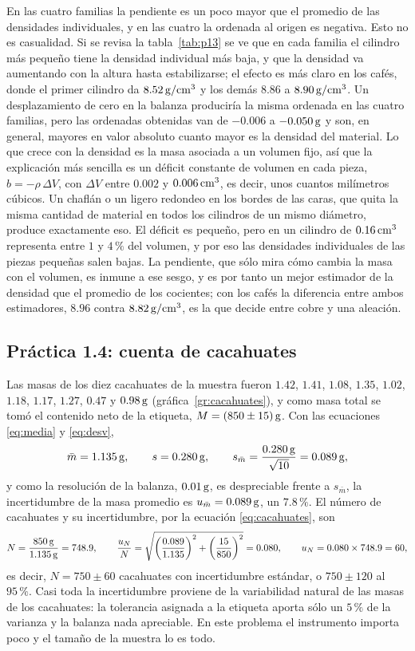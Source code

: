 En las cuatro familias la pendiente es un poco mayor que el promedio de las densidades individuales, y en las cuatro la ordenada al origen es negativa. Esto no es casualidad. Si se revisa la tabla~\ref{tab:p13} se ve que en cada familia el cilindro más pequeño tiene la densidad individual más baja, y que la densidad va aumentando con la altura hasta estabilizarse; el efecto es más claro en los cafés, donde el primer cilindro da $8.52\,\mathrm{g/cm^{3}}$ y los demás $8.86$ a $8.90\,\mathrm{g/cm^{3}}$. Un desplazamiento de cero en la balanza produciría la misma ordenada en las cuatro familias, pero las ordenadas obtenidas van de $-0.006$ a $-0.050\,\mathrm{g}$ y son, en general, mayores en valor absoluto cuanto mayor es la densidad del material. Lo que crece con la densidad es la masa asociada a un volumen fijo, así que la explicación más sencilla es un déficit constante de volumen en cada pieza, $b = -\rho\,\Delta V$, con $\Delta V$ entre $0.002$ y $0.006\,\mathrm{cm^{3}}$, es decir, unos cuantos milímetros cúbicos. Un chaflán o un ligero redondeo en los bordes de las caras, que quita la misma cantidad de material en todos los cilindros de un mismo diámetro, produce exactamente eso. El déficit es pequeño, pero en un cilindro de $0.16\,\mathrm{cm^{3}}$ representa entre $1$ y $4\,\%$ del volumen, y por eso las densidades individuales de las piezas pequeñas salen bajas. La pendiente, que sólo mira cómo cambia la masa con el volumen, es inmune a ese sesgo, y es por tanto un mejor estimador de la densidad que el promedio de los cocientes; con los cafés la diferencia entre ambos estimadores, $8.96$ contra $8.82\,\mathrm{g/cm^{3}}$, es la que decide entre cobre y una aleación.

\subsection{Práctica 1.4: cuenta de cacahuates}

Las masas de los diez cacahuates de la muestra fueron $1.42$, $1.41$, $1.08$, $1.35$, $1.02$, $1.18$, $1.17$, $1.27$, $0.47$ y $0.98\,\mathrm{g}$ (gráfica~\ref{gr:cacahuates}), y como masa total se tomó el contenido neto de la etiqueta, $M = (850 \pm 15)\,\mathrm{g}$. Con las ecuaciones \eqref{eq:media} y \eqref{eq:desv},
\begin{equation*}
    \bar m = 1.135\,\mathrm{g}, \qquad s = 0.280\,\mathrm{g}, \qquad s_{\bar m} = \frac{0.280\,\mathrm{g}}{\sqrt{10}} = 0.089\,\mathrm{g},
\end{equation*}
y como la resolución de la balanza, $0.01\,\mathrm{g}$, es despreciable frente a $s_{\bar m}$, la incertidumbre de la masa promedio es $u_{\bar m} = 0.089\,\mathrm{g}$, un $7.8\,\%$. El número de cacahuates y su incertidumbre, por la ecuación \eqref{eq:cacahuates}, son
\begin{equation*}
    N = \frac{850\,\mathrm{g}}{1.135\,\mathrm{g}} = 748.9, \qquad
    \frac{u_N}{N} = \sqrt{\left(\frac{0.089}{1.135}\right)^{2} + \left(\frac{15}{850}\right)^{2}} = 0.080, \qquad u_N = 0.080 \times 748.9 = 60,
\end{equation*}
es decir, $N = 750 \pm 60$ cacahuates con incertidumbre estándar, o $750 \pm 120$ al $95\,\%$. Casi toda la incertidumbre proviene de la variabilidad natural de las masas de los cacahuates: la tolerancia asignada a la etiqueta aporta sólo un $5\,\%$ de la varianza y la balanza nada apreciable. En este problema el instrumento importa poco y el tamaño de la muestra lo es todo.

